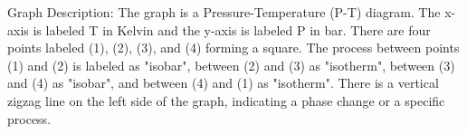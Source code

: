 Graph Description: The graph is a Pressure-Temperature (P-T) diagram. The x-axis is labeled T in Kelvin and the y-axis is labeled P in bar. There are four points labeled (1), (2), (3), and (4) forming a square. The process between points (1) and (2) is labeled as "isobar", between (2) and (3) as "isotherm", between (3) and (4) as "isobar", and between (4) and (1) as "isotherm". There is a vertical zigzag line on the left side of the graph, indicating a phase change or a specific process.